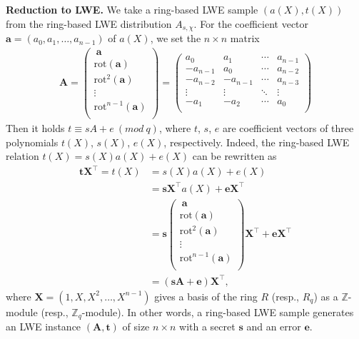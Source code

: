 \documentclass[12pt,a4paper]{article}
\numberwithin{equation}{section}
\begin{document}
\textbf{Reduction to LWE.}
We take a ring-based LWE sample $(a(X), t(X))$ from the ring-based LWE distribution $A_{s,\chi}$. 
For the coefficient vector $\mathbf{a} = (a_0, a_1, \ldots , a_{n-1})$ of $a(X)$, we set the $n \times n$ matrix
\begin{align*}
    \mathbf{A} = \left( \begin{matrix}
        \ \mathbf{a} \\ \mathrm{rot}(\mathbf{a}) \\ \mathrm{rot}^2(\mathbf{a}) \\ \vdots \\ \mathrm{rot}^{n-1}(\mathbf{a}) \\
    \end{matrix} \right) 
    = 
    \left( \begin{matrix}
        a_0 &a_1& \cdots& a_{n-1}\\ 
        -a_{n-1} &a_0& \cdots& a_{n-2}\\ 
        -a_{n-2} &-a_{n-1}& \cdots& a_{n-3}\\ 
        \vdots & \vdots & \ddots & \vdots\\ 
        -a_1 &-a_2& \cdots& a_{0}\\
    \end{matrix} \right)
\end{align*}
Then it holds $t \equiv sA + e \ (mod \ q)$, where $t$, $s$, $e$ are coefficient vectors of three polynomials $t(X)$, $s(X)$, $e(X)$, respectively. Indeed, the ring-based LWE relation $t(X) = s(X)a(X) + e(X)$ can be rewritten as
\begin{align*}
    \mathbf{t}\mathbf{X}^\top = t(X) &= s(X)a(X) + e(X) \\
    &= \mathbf{s}\mathbf{X}^\top a(X) + \mathbf{e}\mathbf{X}^\top \\
    &= \mathbf{s} \left( \begin{matrix}
        \ \mathbf{a} \\ \mathrm{rot}(\mathbf{a}) \\ \mathrm{rot}^2(\mathbf{a}) \\ \vdots \\ \mathrm{rot}^{n-1}(\mathbf{a}) \\
    \end{matrix} \right) \mathbf{X}^\top + \mathbf{e}\mathbf{X}^\top\\
    & = (\mathbf{s}\mathbf{A} + \mathbf{e})\mathbf{X}^\top,
\end{align*}
where $\mathbf{X} = (1, X, X^2, \ldots , X^{n-1})$ gives a basis of the ring $R$ (resp., $R_q$) as a $\mathbb{Z}$-module (resp., $\mathbb{Z}_q$-module).
In other words, a ring-based LWE sample generates an LWE instance $(\mathbf{A}, \mathbf{t})$ of size $n \times n$ with a secret $\mathbf{s}$ and an error $\mathbf{e}$.
\end{document}
